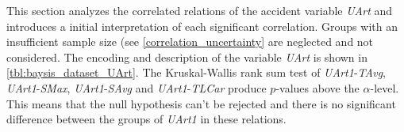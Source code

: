 This section analyzes the correlated relations of the accident variable \textit{UArt} and introduces a initial interpretation of each significant correlation. Groups with an insufficient sample size (see \cref{correlation_uncertainty} are neglected and not considered. The encoding and description of the variable \textit{UArt} is shown in \cref{tbl:baysis_dataset_UArt}. The Kruskal-Wallis rank sum test of \textit{UArt1}-\textit{TAvg}, \textit{UArt1}-\textit{SMax}, \textit{UArt1}-\textit{SAvg} and \textit{UArt1}-\textit{TLCar} produce $p$-values above the $\alpha$-level. This means that the null hypothesis can't be rejected and there is no significant difference between the groups of \textit{UArt1} in these relations. 


